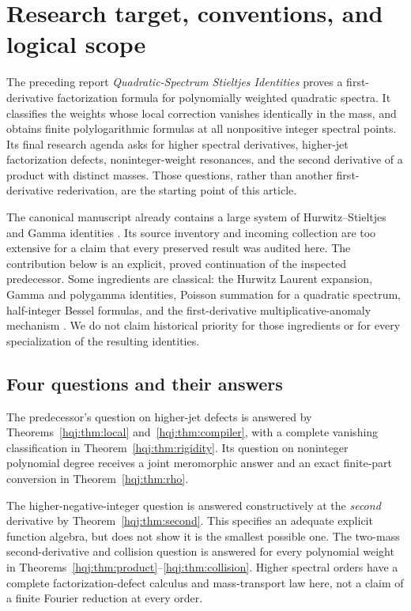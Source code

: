 \documentclass[11pt,letterpaper]{article}
\numberwithin{equation}{section}
\theoremstyle{definition}
\begin{document}

\section{Research target, conventions, and logical scope}
\label{hqj:sec:scope}

The preceding report \emph{Quadratic-Spectrum Stieltjes Identities}
\cite{predecessor} proves a first-derivative factorization formula for
polynomially weighted quadratic spectra. It classifies the weights whose
local correction vanishes identically in the mass, and obtains finite
polylogarithmic formulas at all nonpositive integer spectral points.
Its final research agenda asks for higher spectral derivatives,
higher-jet factorization defects, noninteger-weight resonances, and the
second derivative of a product with distinct masses. Those questions,
rather than another first-derivative rederivation, are the starting point
of this article.

The canonical manuscript already contains a large system of
Hurwitz--Stieltjes and Gamma identities \cite{repo}. Its source inventory
and incoming collection are too extensive for a claim that every
preserved result was audited here. The contribution below is an explicit,
proved continuation of the inspected predecessor. Some ingredients are
classical: the Hurwitz Laurent expansion, Gamma and polygamma identities,
Poisson summation for a quadratic spectrum, half-integer Bessel formulas,
and the first-derivative multiplicative-anomaly mechanism
\cite{hurwitz,gamma,polygamma,bessel,order,dowker}. We do not claim
historical priority for those ingredients or for every specialization of
the resulting identities.

\subsection{Four questions and their answers}
The predecessor's question on higher-jet defects is answered by
Theorems~\ref{hqj:thm:local} and~\ref{hqj:thm:compiler}, with a complete
vanishing classification in Theorem~\ref{hqj:thm:rigidity}. Its question
on noninteger polynomial degree receives a joint meromorphic answer and
an exact finite-part conversion in Theorem~\ref{hqj:thm:rho}.

The higher-negative-integer question is answered constructively at the
\emph{second} derivative by Theorem~\ref{hqj:thm:second}. This specifies
an adequate explicit function algebra, but does not show it is the
smallest possible one. The two-mass second-derivative and collision
question is answered for every polynomial weight in
Theorems~\ref{hqj:thm:product}--\ref{hqj:thm:collision}. Higher spectral
orders have a complete factorization-defect calculus and mass-transport
law here, not a claim of a finite Fourier reduction at every order.
\end{document}
